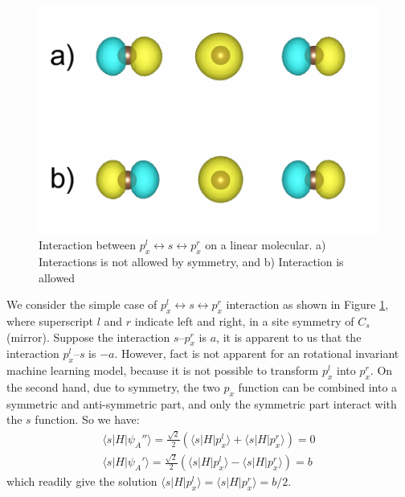 \documentclass{article}
\begin{document}
\begin{figure}[h!]
    \centering
    \includegraphics{../figures/S-Px.pdf}
    \caption{Interaction between $p_x^l \leftrightarrow s \leftrightarrow p_x^r$ on a linear molecular. 
                a) Interactions is not allowed by symmetry, and b) Interaction is allowed}
    \label{F:s_px_chain}
\end{figure}

We consider the simple case of $p_x^l \leftrightarrow s \leftrightarrow p_x^r$ interaction as shown in Figure \ref{F:s_px_chain}, 
where superscript $l$ and $r$ indicate left and right, in 
a site symmetry of $C_s$ (mirror). Suppose the interaction $s$--$p_x^r$ is $a$, it is apparent to us that the interaction $p_x^l$--$s$ is $-a$. However,
fact is not apparent for an rotational invariant machine learning model, because it is not possible to transform $p_x^l$
into $p_x^r$. 
On the second hand, due to symmetry, the two $p_x$ function can be combined into a symmetric and anti-symmetric part, and 
only the symmetric part interact with the $s$ function. So we have:
\begin{align}
    \label{E:px_s_AO_MO}
    \langle s | H | \psi_A'' \rangle = \frac{\sqrt{2}}{2} \left( \langle s | H | p_x^l \rangle + \langle s | H | p_x^r \rangle\right) = 0 \\
    \langle s | H | \psi_A' \rangle = \frac{\sqrt{2}}{2} \left( \langle s | H | p_x^l \rangle - \langle s | H | p_x^r \rangle\right) = b
\end{align}
which readily give the solution  $\langle s | H | p_x^l \rangle = \langle s | H | p_x^r \rangle = b/2$. 
\end{document}
